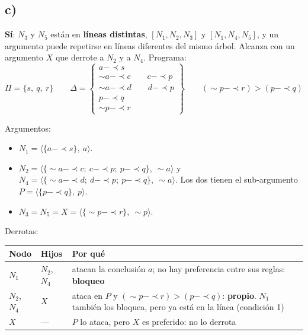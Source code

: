 \documentclass[11pt,a4paper]{article}
\newcommand{\reb}{\mathrel{-\!\!\!\prec}}         %
\begin{document}
\subsection{c)}

\begin{center}
\begin{minipage}{\linewidth}
\centering
{}
\end{minipage}
\end{center}

\textbf{Sí}: $N_3$ y $N_5$ están en \textbf{líneas distintas}, $[N_1, N_2, N_3]$ y $[N_1, N_4, N_5]$, y un argumento puede repetirse en líneas diferentes del mismo árbol. Alcanza con un argumento $X$ que derrote a $N_2$ y a $N_4$. Programa:
\[
\Pi = \{s,\ q,\ r\}
\qquad
\Delta = \left\{\begin{array}{l}
a \reb s \\
{\sim}a \reb c \qquad c \reb p \\
{\sim}a \reb d \qquad d \reb p \\
p \reb q \\
{\sim}p \reb r
\end{array}\right\}
\qquad
({\sim}p \reb r) > (p \reb q)
\]

Argumentos:
\begin{itemize}
  \item $N_1 = \langle \{a \reb s\},\ a\rangle$.
  \item $N_2 = \langle \{{\sim}a \reb c;\ c \reb p;\ p \reb q\},\ {\sim}a\rangle$ y $N_4 = \langle \{{\sim}a \reb d;\ d \reb p;\ p \reb q\},\ {\sim}a\rangle$. Los dos tienen el sub-argumento $P = \langle \{p \reb q\},\ p\rangle$.
  \item $N_3 = N_5 = X = \langle \{{\sim}p \reb r\},\ {\sim}p\rangle$.
\end{itemize}

Derrotas:
\begin{center}
\small
\begin{tabularx}{\linewidth}{@{}l l >{\raggedright\arraybackslash}X@{}}
\toprule
\textbf{Nodo} & \textbf{Hijos} & \textbf{Por qué} \\
\midrule
$N_1$ & $N_2$, $N_4$ & atacan la conclusión $a$; no hay preferencia entre sus reglas: \textbf{bloqueo} \\
$N_2$, $N_4$ & $X$ & ataca en $P$ y $({\sim}p \reb r) > (p \reb q)$: \textbf{propio}. $N_1$ también los bloquea, pero ya está en la línea (condición 1) \\
$X$ & --- & $P$ lo ataca, pero $X$ es preferido: no lo derrota \\
\bottomrule
\end{tabularx}
\end{center}
\end{document}
